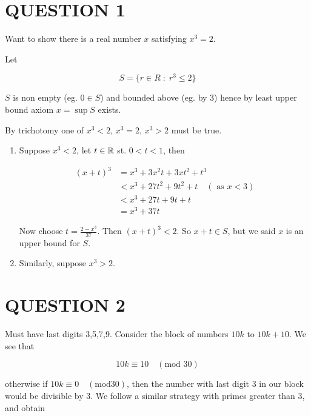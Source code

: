 \documentclass[a4paper]{article}
\begin{document}
	
\maketitle

\section{QUESTION 1}

Want to show there is a real number $ x $ satisfying $ x^{3} = 2 $. 

Let

\[ S = \{ r \in R \; : \; r^{3} \leq 2 \} \]

$ S $ is non empty (eg. $ 0 \in S $) and bounded above  (eg. by 3) hence by least upper bound axiom $ x = \sup S $ exists.

By trichotomy one of $ x^{3} < 2 $, $ x^{3} = 2 $, $ x^{3} > 2 $ must be true.

\begin{enumerate}
	\item Suppose $ x^{3} < 2 $, let $ t \in \mathbb{R} $ st. $ 0 < t < 1 $, then
	
	\begin{align*}
	(x + t)^{3}  & =   x^{3} + 3x^{2}t + 3x t^{2} + t^{3}  \\
	& < x^{3} + 27 t^{2} + 9 t^{2} + t \quad (\text{ as } x < 3)\\
	& < x^{3} + 27 t + 9 t + t \\
	& = x^{3} + 37t 
	\end{align*} 
	
	Now choose $ t = \frac{2-x^{3}}{37}$. Then $ (x + t)^{3} < 2 $. So $ x + t \in S $, but we said $ x $ is an upper bound for $ S $.
	
	\item Similarly, suppose $ x^{3} > 2 $. 
	
\end{enumerate} 

\section{QUESTION 2}

Must have last digits 3,5,7,9.
Consider the block of numbers $ 10k  $ to $ 10k + 10 $.
We see that

\[ 10k \equiv 10 \quad (\text{mod } 30) \]

otherwise if $   10k \equiv 0 \quad (\text{mod} 30)$, then the number with last digit 3 in our block would be divisible by 3. We follow a similar strategy with primes greater than 3, and obtain
\end{document}
